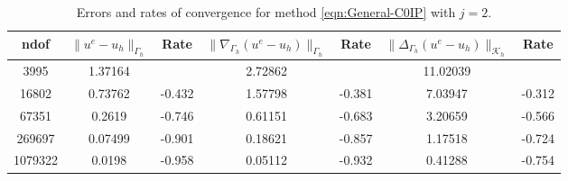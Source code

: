 \documentclass[10pt, a4paper]{amsart}
\newcommand{\nab}{\nabla}
\newcommand{\calK}{\mathcal{K}}
\theoremstyle{definition}
\theoremstyle{remark}
\theoremstyle{example}
\numberwithin{equation}{section}
\begin{document}
\begin{table}[h]
\centering
\caption{\label{tab:MethodJ2}Errors and rates of convergence for method \eqref{eqn:General-C0IP} with $j=2$. }
\begin{tabular}{c c c c c c c }
\hline
ndof & $\|u^e - u_{h}\|_{\Gamma_{h}}$ & Rate & $\|\nab_{\Gamma_h}(u^e - u_h)\|_{\Gamma_h}$ & Rate & $\|\Delta_{\Gamma_h}(u^e - u_h)\|_{\calK_h}$ & Rate\\
\hline
3995	&1.37164	&	        &2.72862	&	     &11.02039	&\\
16802	&0.73762	&-0.432	     &1.57798	&-0.381	&7.03947	&-0.312\\
67351	&0.2619	      &-0.746	&0.61151	&-0.683	&3.20659	&-0.566\\
269697	&0.07499	&-0.901	&0.18621	&-0.857	&1.17518	&-0.724\\
1079322	&0.0198	    &-0.958	    &0.05112	&-0.932	&0.41288	&-0.754
\end{tabular}
\end{table}





\end{document}
